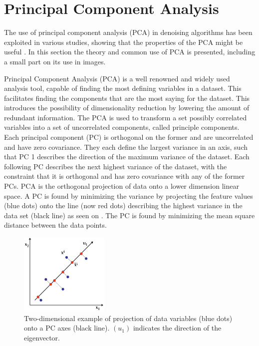 

\section{Principal Component Analysis}

The use of principal component analysis (PCA) in denoising algorithms has been exploited in various studies, showing that the properties of the PCA might be useful \cite{Behzadi2013}. In this section the theory and common use of PCA is presented, including a small part on its use in images. 

Principal Component Analysis (PCA) is a well renowned and widely used analysis tool, capable of finding the most defining variables in a dataset. This facilitates finding the components that are the most saying for the dataset. This introduces the possibility of dimensionality reduction by lowering the amount of redundant information. The PCA is used to transform a set possibly correlated variables into a set of uncorrelated components, called principle components. Each principal component (PC) is
orthogonal on the former and are uncorrelated and have zero covariance. They each define the largest
variance in an axis, such that PC 1 describes the direction of the maximum variance of the dataset. Each
following PC describes the next highest variance of the dataset, with the constraint that it is orthogonal
and has zero covariance with any of the former PCs. PCA is the orthogonal projection of data onto a
lower dimension linear space.  A PC is found by minimizing the variance by projecting the feature values (blue dots) onto the line (now red dots) describing the highest variance in the data set (black line) as seen on . The PC is found by minimizing the mean square distance between the data points. \cite{Semmlow2004}

\begin{figure}[H] 
	\includegraphics[width=0.38\textwidth]{figures/aBackground/projection}
	\caption{Two-dimensional example of projection of data variables (blue dots) onto a PC axes (black line). $(u_1)$ indicates the direction of the eigenvector. \cite{PCA2018}}
	\label{projection}
\end{figure}

